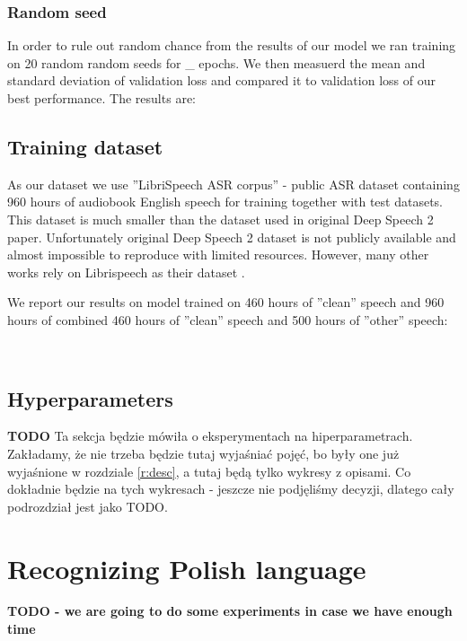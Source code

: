 \documentclass[licencjacka,en]{pracamgr}
\newcommand{\todoplot}[1]{
\ \\
\noindent%
\begin{minipage}{\linewidth}%
\makebox[\linewidth]{%
		\begin{tikzpicture}
		\begin{axis}[
            ymin = 0, ymax = 5,
            xmin = 0, xmax = 600,
            minor y tick num = 4,
            minor x tick num = 1,
            ymajorgrids = true,
            grid style = dashed,
            scaled x ticks = false,
            xlabel = TODO,
            ylabel = TODO,
            legend pos=outer north east,
            no markers
          ]
		  \addplot table[x=epochs,y=training]{\first};
		  \addlegendentry{TODO}

		\end{axis}
		\end{tikzpicture}
		}\captionof{figure}{#1}\label{diag:time}     
\end{minipage}
}
\begin{document}
\subsection{Random seed}
In order to rule out random chance from the results of our model we ran training on 20 random random seeds for \_ epochs. We then measuerd the mean and standard deviation of validation loss and compared it to validation loss of our best performance. The results are:

\section{Training dataset}
As our dataset we use ''LibriSpeech ASR corpus'' \cite{DATA} - public ASR dataset containing 960 hours of audiobook English speech for training together with test datasets. This dataset is much smaller than the dataset used in original Deep Speech 2 paper. Unfortunately original Deep Speech 2 dataset is not publicly available and almost impossible to reproduce with limited resources. However, many other works rely on Librispeech as their dataset \cite{LIBRI-EX}.

We report our results on model trained on 460 hours of ''clean'' speech and 960 hours of combined 460 hours of ''clean'' speech and 500 hours of ''other'' speech:

\todoplot{TODO}

\section{Hyperparameters}
\textbf{TODO} Ta sekcja będzie mówiła o eksperymentach na hiperparametrach. Zakładamy, że nie trzeba będzie tutaj wyjaśniać pojęć, bo były one już wyjaśnione w rozdziale \ref{r:desc}, a tutaj będą tylko wykresy z opisami. Co dokładnie będzie na tych wykresach - jeszcze nie podjęliśmy decyzji, dlatego cały podrozdział jest jako TODO.

\chapter{Recognizing Polish language}\label{r:polish}
\textbf{TODO - we are going to do some experiments in case we have enough time}

\end{document}
